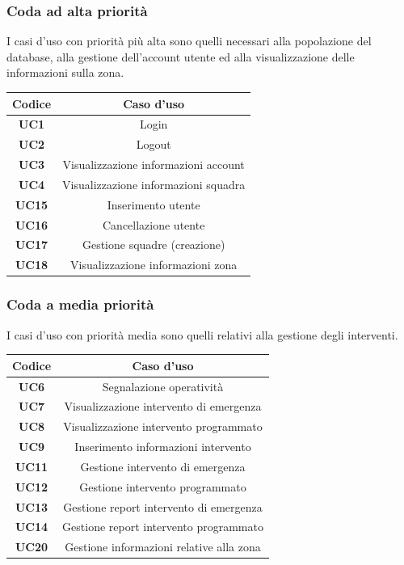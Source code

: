 \subsubsection{Coda ad alta priorità}
I casi d'uso con priorità più alta sono quelli necessari alla popolazione del database, alla gestione dell'account utente ed alla visualizzazione delle informazioni sulla zona.

\begin{center}
	\begin{tabular}{|c|c|}
		\hline
		\textbf{Codice} & \textbf{Caso d'uso} \\ \hline
		\textbf{UC1} & Login \\ \hline
		\textbf{UC2} & Logout \\ \hline
		\textbf{UC3} & Visualizzazione informazioni account \\ \hline
		\textbf{UC4} & Visualizzazione informazioni squadra \\ \hline
		\textbf{UC15} & Inserimento utente \\ \hline
		\textbf{UC16} & Cancellazione utente\\ \hline
		\textbf{UC17} & Gestione squadre (creazione) \\ \hline
		\textbf{UC18} & Visualizzazione informazioni zona \\ \hline
	\end{tabular}
\end{center}

\subsubsection{Coda a media priorità}
I casi d'uso con priorità media sono quelli relativi alla gestione degli interventi.

	\begin{center}
		\begin{tabular}{|c|c|}
			\hline
			\textbf{Codice} & \textbf{Caso d'uso} \\ \hline
			\textbf{UC6} & Segnalazione operatività\\ \hline
			\textbf{UC7} & Visualizzazione intervento di emergenza \\ \hline
			\textbf{UC8} & Visualizzazione intervento programmato \\ \hline
			\textbf{UC9} & Inserimento informazioni intervento \\ \hline
			\textbf{UC11} & Gestione intervento di emergenza \\ \hline
			\textbf{UC12} & Gestione intervento programmato \\ \hline
			\textbf{UC13} & Gestione report intervento di emergenza \\ \hline
			\textbf{UC14} & Gestione report intervento programmato \\ \hline
			\textbf{UC20} & Gestione informazioni relative alla zona \\ \hline
		\end{tabular}
	\end{center}

